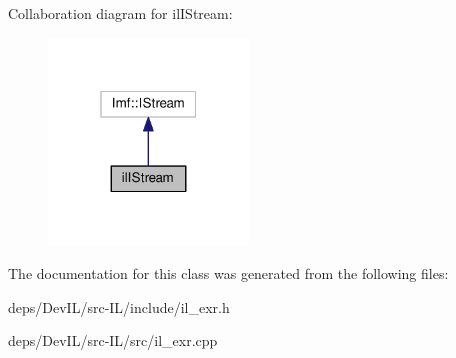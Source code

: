 Collaboration diagram for il\+I\+Stream\+:
\nopagebreak
\begin{figure}[H]
\begin{center}
\leavevmode
\includegraphics[width=151pt]{d7/d31/classilIStream__coll__graph}
\end{center}
\end{figure}


The documentation for this class was generated from the following files\+:\begin{DoxyCompactItemize}
\item 
deps/\+Dev\+I\+L/src-\/\+I\+L/include/il\+\_\+exr.\+h\item 
deps/\+Dev\+I\+L/src-\/\+I\+L/src/il\+\_\+exr.\+cpp\end{DoxyCompactItemize}
